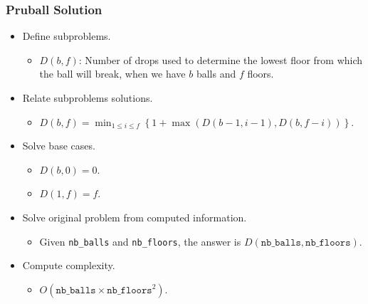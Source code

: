\documentclass{beamer}
\begin{document}
\begin{frame}%
\frametitle{Pruball Solution}

\scriptsize
\begin{itemize}

\item Define subproblems.
\begin{itemize}
\scriptsize
\item $D(b, f)$: Number of drops used to determine the lowest floor from which the ball will break, when
we have $b$ balls and $f$ floors.
\end{itemize}

\vspace{0.1cm}

\item<2-> Relate subproblems solutions.
\begin{itemize}
\scriptsize
\item<2-> $D(b, f) = \min_{1 \le i \le f}\left\{ 1 + \max(D(b - 1, i - 1), D(b, f - i)) \right\}$.
\end{itemize}

\vspace{0.1cm}

\item<3-> Solve base cases.
\begin{itemize}
\scriptsize
\item<3-> $D(b, 0) = 0$.
\item<3-> $D(1, f) = f$.
\end{itemize}

\vspace{0.1cm}

\item<4-> Solve original problem from computed information.
\begin{itemize}
\scriptsize
\item<4-> Given \texttt{nb\_balls} and \texttt{nb\_floors}, the answer is $D(\texttt{nb\_balls}, \texttt{nb\_floors})$.
\end{itemize}

\vspace{0.1cm}

\item<5-> Compute complexity.
\begin{itemize}
\scriptsize
\item<5-> $O(\texttt{nb\_balls} \times \texttt{nb\_floors}^2)$.
\end{itemize}

\end{itemize}

\end{frame}
\end{document}
